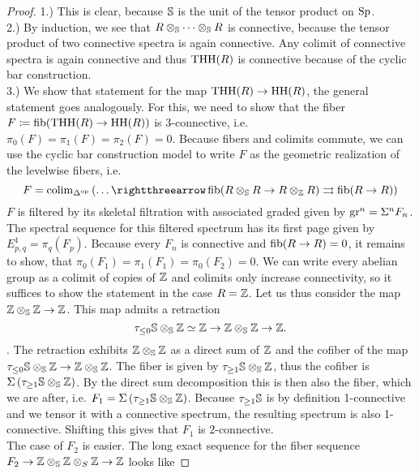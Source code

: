 \begin{proof}
    1.) This is clear, because $\S$ is the unit of the tensor product on $\Sp$. \\
    2.) By induction, we see that $R\otimes_\S\dots\otimes_\S R$ is connective, because the tensor product of two connective spectra is again connective. Any colimit of connective spectra is again connective and thus $\THH(R)$ is connective because of the cyclic bar construction. \\
    3.) We show that statement for the map $\THH(R)\to \HH(R)$, the general statement goes analogously.
    For this, we need to show that the fiber $F\coloneqq \fib(\THH(R)\to \HH(R))$ is 3-connective, i.e. $\pi_0(F)=\pi_1(F)=\pi_2(F)=0$. Because fibers and colimits commute, we can use the cyclic bar construction model to write $F$ as the geometric realization of the levelwise fibers, i.e.
    \begin{equation*}
        F=\colim_{\Delta^{\op}} \left( \dots\rightthreearrow \fib(R\otimes_\S R\to R\otimes_\Z R) \rightrightarrows \fib(R\to R) \right)
    \end{equation*}
    $F$ is filtered by its skeletal filtration with associated graded given by $\gr^n=\Sigma^n F_n$. The spectral sequence for this filtered spectrum has its first page given by $E^1_{p,q}=\pi_q(F_p)$. Because every $F_n$ is connective and $\fib(R\to R)=0$, it remains to show, that $\pi_0(F_1)=\pi_1(F_1)=\pi_0(F_2)=0$. We can write every abelian group as a colimit of copies of $\Z$ and colimits only increase connectivity, so it suffices to show the statement in the case $R=\Z$. Let us thus consider the map $\Z\otimes_\S \Z\to \Z$. This map admits a retraction 
    \begin{equation*}
        \tau_{\leq 0}\S\otimes_\S\Z\simeq \Z\to \Z\otimes_\S \Z\to \Z.
    \end{equation*}.
    The retraction exhibits $\Z\otimes_\S\Z$ as a direct sum of $\Z$ and the cofiber of the map $\tau_{\leq 0}\S\otimes_\S\Z\to \Z\otimes_\S\Z$. The fiber is given by $\tau_{\geq 1}\S\otimes_\S\Z$, thus the cofiber is $\Sigma\left( \tau_{\geq 1}\S\otimes_\S\Z \right)$. By the direct sum decomposition this is then also the fiber, which we are after, i.e. $F_1=\Sigma\left( \tau_{\geq 1}\S\otimes_\S\Z \right)$. Because $\tau_{\geq 1}\S$ is by definition 1-connective and we tensor it with a connective spectrum, the resulting spectrum is also 1-connective. Shifting this gives that $F_1$ is 2-connective. \\
    The case of $F_2$ is easier. The long exact sequence for the fiber sequence $F_2\to \Z\otimes_\S\Z\otimes_S\Z\to \Z$ looks like 

\end{proof}
